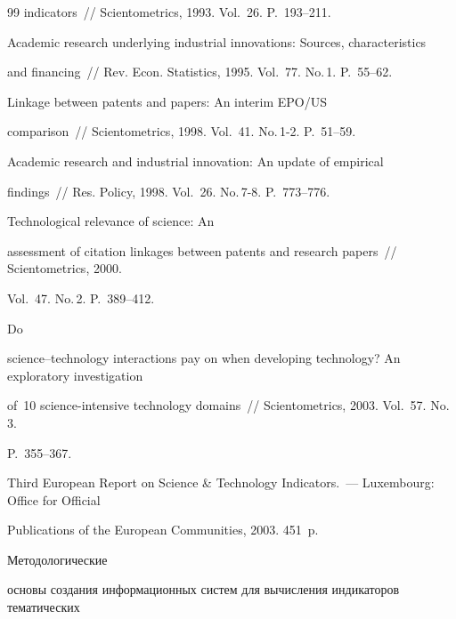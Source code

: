 {{\begin{thebibliography}{99}
indicators~/\!\!/ Scientometrics, 1993. Vol.~26. P.~193--211.




 Academic research underlying industrial innovations: Sources, characteristics 


and financing~/\!\!/ Rev. Econ. Statistics, 1995. Vol.~77. No.\,1. P.~55--62.




 Linkage between patents and papers: An interim EPO/US 


comparison~/\!\!/ Scientometrics, 1998. Vol.~41. No.\,1-2. P.~51--59.




 Academic research and industrial innovation: An update of empirical 


findings~/\!\!/ Res. Policy, 1998. Vol.~26. No.\,7-8. P.~773--776.







 Technological relevance of science: An 


assessment of citation linkages between patents and research papers~/\!\!/ Scientometrics, 2000. 


Vol.~47. No.\,2. P.~389--412.




 Do 


science--technology interactions pay on when developing technology? An exploratory investigation 


of~10 science-intensive technology domains~/\!\!/ Scientometrics, 2003. Vol.~57. No.\,3.  


P.~355--367.




Third European Report on Science \& Technology Indicators.~--- Luxembourg: Office for Official 


Publications of the European Communities, 2003. 451~p.




 Методологические 


основы создания информационных систем для вычисления индикаторов тематических 



\end{thebibliography}}}
